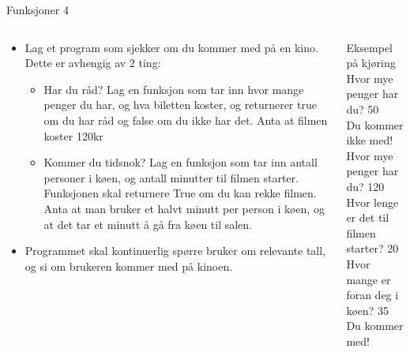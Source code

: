 \documentclass[screen, aspectratio=169]{beamer}
\begin{document}
\begin{frame}{Funksjoner 4}
	\begin{columns}
		\begin{column}{.6\textwidth}
			\begin{itemize}
				\item Lag et program som sjekker om du kommer med på en kino. Dette er avhengig av 2 ting:
				\begin{itemize}
					\item Har du råd? Lag en funksjon som tar inn hvor mange penger du har, og hva biletten koster, og returnerer true om du har råd og false om du ikke har det. Anta at filmen koster 120kr
					\item Kommer du tidsnok? Lag en funksjon som tar inn antall personer i køen, og antall minutter til filmen starter. Funksjonen skal returnere True om du kan rekke filmen. Anta at man bruker et halvt minutt per person i køen, og at det tar et minutt å gå fra køen til salen.
				\end{itemize}
				\item Programmet skal kontinuerlig spørre bruker om relevante tall, og si om brukeren kommer med på kinoen.
			\end{itemize}
		\end{column}
		\begin{column}{.4\textwidth}
			\begin{exampleblock}{Eksempel på kjøring}
				Hvor mye penger har du? \textcolor{input-color}{50}\\
				Du kommer ikke med!\\
				Hvor mye penger har du? \textcolor{input-color}{120}\\
				Hvor lenge er det til filmen starter? \textcolor{input-color}{20}\\
				Hvor mange er foran deg i køen? \textcolor{input-color}{35}\\
				Du kommer med!
			\end{exampleblock}
		\end{column}
	\end{columns}
\end{frame}
\end{document}

